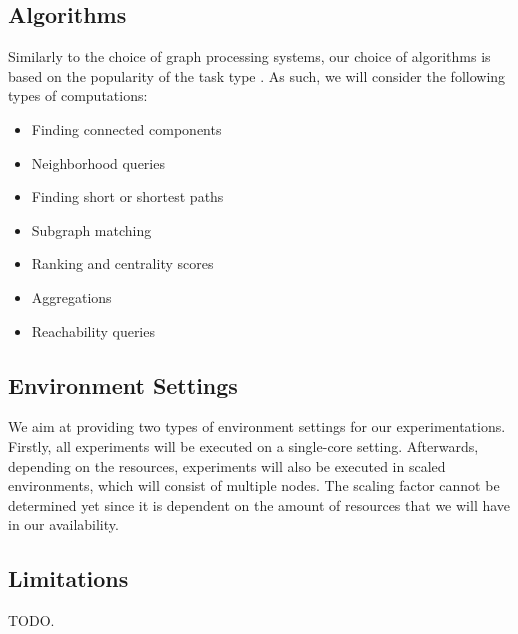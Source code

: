 \documentclass[a4paper,11pt]{article}
\begin{document}
\subsection{Algorithms} \label{algos}

\par Similarly to the choice of graph processing systems, our choice of algorithms is based on the popularity of the task type \cite{survey}. As such, we will consider the following types of computations:

\begin{itemize}
	\item Finding connected components
	\item Neighborhood queries
	\item Finding short or shortest paths
	\item Subgraph matching
	\item Ranking and centrality scores
	\item Aggregations
	\item Reachability queries
\end{itemize}

\subsection{Environment Settings}

\par We aim at providing two types of environment settings for our experimentations. Firstly, all experiments will be executed on a single-core setting. Afterwards, depending on the resources, experiments will also be executed in scaled environments, which will consist of multiple nodes. The scaling factor cannot be determined yet since it is dependent on the amount of resources that we will have in our availability.

\subsection{Limitations} \label{limitations}

TODO.

\end{document}
